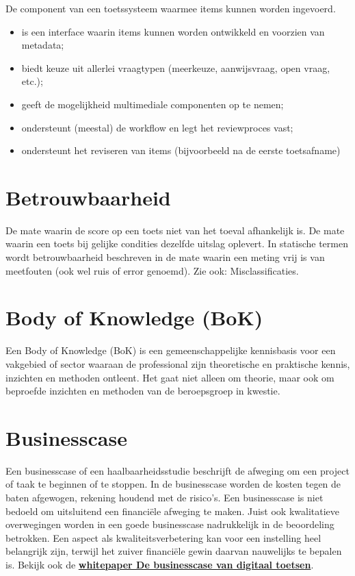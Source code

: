 \documentclass[
  letterpaper,
  DIV=11,
  numbers=noendperiod]{scrreprt}
\providecommand{\tightlist}{%
  \setlength{\itemsep}{0pt}\setlength{\parskip}{0pt}}\usepackage{longtable,booktabs,array}
\begin{document}
De component van een toetssysteem waarmee items kunnen worden ingevoerd.

\begin{itemize}
\tightlist
\item
  is een interface waarin items kunnen worden ontwikkeld en voorzien van
  metadata;
\item
  biedt keuze uit allerlei vraagtypen (meerkeuze, aanwijsvraag, open
  vraag, etc.);
\item
  geeft de mogelijkheid multimediale componenten op te nemen;
\item
  ondersteunt (meestal) de workflow en legt het reviewproces vast;
\item
  ondersteunt het reviseren van items (bijvoorbeeld na de eerste
  toetsafname)
\end{itemize}

\hypertarget{betrouwbaarheid}{%
\section{Betrouwbaarheid}\label{betrouwbaarheid}}

De mate waarin de score op een toets niet van het toeval afhankelijk is.
De mate waarin een toets bij gelijke condities dezelfde uitslag
oplevert. In statische termen wordt betrouwbaarheid beschreven in de
mate waarin een meting vrij is van meetfouten (ook wel ruis of error
genoemd). Zie ook: Misclassificaties.

\hypertarget{body-of-knowledge-bok}{%
\section{Body of Knowledge (BoK)}\label{body-of-knowledge-bok}}

Een Body of Knowledge (BoK) is een gemeenschappelijke kennisbasis voor
een vakgebied of sector waaraan de professional zijn theoretische en
praktische kennis, inzichten en methoden ontleent. Het gaat niet alleen
om theorie, maar ook om beproefde inzichten en methoden van de
beroepsgroep in kwestie.

\hypertarget{businesscase}{%
\section{Businesscase}\label{businesscase}}

Een businesscase of een haalbaarheidsstudie beschrijft de afweging om
een project of taak te beginnen of te stoppen. In de businesscase worden
de kosten tegen de baten afgewogen, rekening houdend met de risico's.
Een businesscase is niet bedoeld om uitsluitend een financiële afweging
te maken. Juist ook kwalitatieve overwegingen worden in een goede
businesscase nadrukkelijk in de beoordeling betrokken. Een aspect als
kwaliteitsverbetering kan voor een instelling heel belangrijk zijn,
terwijl het zuiver financiële gewin daarvan nauwelijks te bepalen is.
Bekijk ook de
\href{https://www.surf.nl/kennisbank/2014/whitepaper-de-businesscase-\%20van-digitaal-toetsen.html}{\textbf{whitepaper
De businesscase van digitaal toetsen}}.
\end{document}
